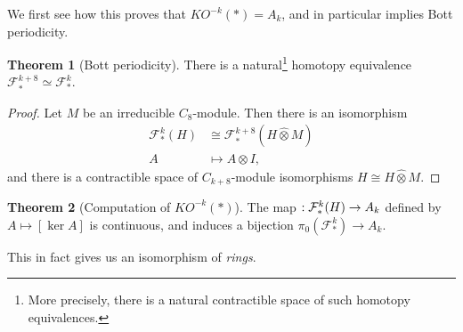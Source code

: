 \documentclass{shortart}
\theoremstyle{definition}
\newtheorem*{thm}{Theorem}
\let\index\relax %
\DeclareMathOperator{\index}{idx}
\newcommand\gotimes{\mathbin{\hat\otimes}}
\begin{document}
We first see how this proves that $KO^{-k}(*) = A_k$, and in particular implies Bott periodicity.
\begin{thm}[Bott periodicity]
  There is a natural\footnote{More precisely, there is a natural contractible space of such homotopy equivalences.} homotopy equivalence $\mathcal{F}_*^{k + 8} \simeq \mathcal{F}_*^k$.
\end{thm}
\begin{proof}
  Let $M$ be an irreducible $C_8$-module. Then there is an isomorphism
  \begin{align*}
    \mathcal{F}_*^k(H) &\cong \mathcal{F}_*^{k + 8}(H \gotimes M)\\
    A &\mapsto A \otimes I,
  \end{align*}
  and there is a contractible space of $C_{k + 8}$-module isomorphisms $H \cong H\gotimes M$.
\end{proof}
\begin{thm}[Computation of $KO^{-k}(*)$]
  The map $\index: \mathcal{F}_*^k(H) \to A_k$ defined by $A \mapsto [\ker A]$ is continuous, and induces a bijection $\pi_0(\mathcal{F}^k_*) \to A_k$.
\end{thm}
This in fact gives us an isomorphism of \emph{rings}.
\end{document}
